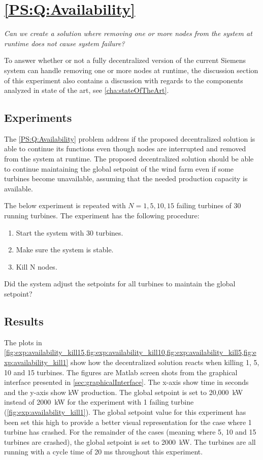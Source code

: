 \section{\ref{PS:Q:Availability}}

\textit{Can we create a solution where removing one or more nodes from the system at runtime does not cause system failure?}\newline\newline

\noindent To answer whether or not a fully decentralized version of the current Siemens system can handle removing one or more nodes at runtime, the discussion section of this experiment also contains a discussion with regards to the components analyzed in state of the art, see \cref{cha:stateOfTheArt}.

\subsection{Experiments}
The \ref{PS:Q:Availability} problem address if the proposed decentralized solution is able to continue its functions even though nodes are interrupted and removed from the system at runtime.
The proposed decentralized solution should be able to continue maintaining the global setpoint of the wind farm even if some turbines become unavailable, assuming that the needed production capacity is available.

The below experiment is repeated with $N = 1, 5, 10, 15$ failing turbines of 30 running turbines.
%
The experiment has the following procedure:
\begin{enumerate}
	\item Start the system with 30 turbines.
	\item Make sure the system is stable.
	\item Kill N nodes.
\end{enumerate}

Did the system adjust the setpoints for all turbines to maintain the global setpoint?

\subsection{Results}
\label{sec:res:availability}
The plots in \cref{fig:exp:availability_kill15,fig:exp:availability_kill10,fig:exp:availability_kill5,fig:exp:availability_kill1} show how the decentralized solution reacts when killing 1, 5, 10 and 15 turbines. The figures are Matlab screen shots from the graphical interface presented in \cref{sec:graphicalInterface}. The x-axis show time in seconds and the y-axis show kW production. The global setpoint is set to 20,000~kW instead of 2000~kW for the experiment with 1 failing turbine (\cref{fig:exp:availability_kill1}). The global setpoint value for this experiment has been set this high to provide a better visual representation for the case where 1 turbine has crashed. 
For the remainder of the cases (meaning where 5, 10 and 15 turbines are crashed), the global setpoint is set to 2000~kW.
The turbines are all running with a cycle time of 20 ms throughout this experiment.

